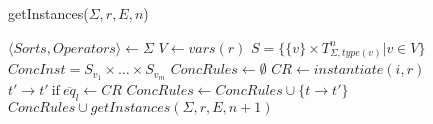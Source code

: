\documentclass{article}[12pt,a4paper]
\theoremstyle{definition}
\begin{document}
\begin{algorithm}
  \caption{getInstances($\Sigma,r,E,n$)}\label{alg:cap}
  \begin{algorithmic}
    \State $\langle Sorts, Operators \rangle \gets \Sigma$
    \State $V \gets vars(r)$    
    \State $S = \{\{v\} \times T_{\Sigma,type(v)}^n | v \in V\}$ 
    \State $ConcInst = S_{v_1} \times \ldots \times S_{v_m}$
    \State $ConcRules \gets \emptyset$ 
    \State $CR \gets instantiate(i,r)$
    \State $t' \rightarrow t'~\text{if}~\overline{eq}_l \gets CR$
    \State $ConcRules \gets ConcRules \cup \{t \rightarrow t'\}$
    \EndIf
    \EndFor\\
    \Return $ConcRules \cup getInstances(\Sigma,r,E,n+1)$
  \end{algorithmic}
\end{algorithm}
\end{document}
